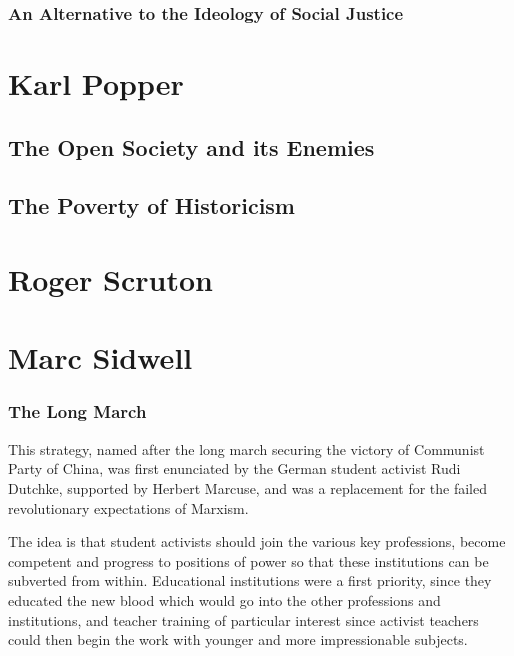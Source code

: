 \documentclass[10pt,titlepage]{book}
\begin{document}
\subsubsection{An Alternative to the Ideology of Social Justice}

\section{Karl Popper}

\subsection{The Open Society and its Enemies}

\cite{popperOSE1,popperOSE2}

\subsection{The Poverty of Historicism}

\cite{popperPOH}

\section{Roger Scruton}

\cite{scruton85,scruton15}


\section{Marc Sidwell}

\subsubsection{The Long March}

\cite{sidwell-long}

This strategy, named after the long march securing the victory of Communist Party of China, was first enunciated by the German student activist Rudi Dutchke, supported by Herbert Marcuse, and was a replacement for the failed revolutionary expectations of Marxism.

The idea is that student activists should join the various key professions, become competent and progress to positions of power so that these institutions can be subverted from within.
Educational institutions were a first priority, since they educated the new blood which would go into the other professions and institutions, and teacher training of particular interest since activist teachers could then begin the work with younger and more impressionable subjects.
\end{document}
